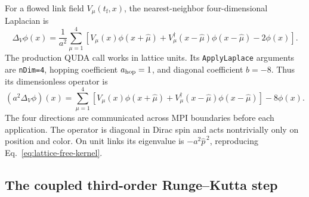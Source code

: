 \documentclass[11pt]{article}
\numberwithin{equation}{section}
\newcommand{\tf}{t_{\mathrm f}}
\begin{document}
For a flowed link field \(V_\mu(\tf,x)\), the nearest-neighbor
four-dimensional Laplacian is
\begin{equation}
  \Delta_V\phi(x)
  =
  \frac{1}{a^2}\sum_{\mu=1}^{4}
  \left[
    V_\mu(x)\phi(x+\hat\mu)
    +V_\mu^\dagger(x-\hat\mu)\phi(x-\hat\mu)
    -2\phi(x)
  \right].
  \label{eq:lattice-laplacian}
\end{equation}
The production QUDA call works in lattice units.  Its
\texttt{ApplyLaplace} arguments are \texttt{nDim=4}, hopping coefficient
\(a_{\rm hop}=1\), and diagonal coefficient \(b=-8\).  Thus its dimensionless
operator is
\begin{equation}
  (a^2\Delta_V\phi)(x)
  =\sum_{\mu=1}^{4}
  \left[
    V_\mu(x)\phi(x+\hat\mu)
    +V_\mu^\dagger(x-\hat\mu)\phi(x-\hat\mu)
  \right]-8\phi(x).
  \label{eq:quda-lattice-laplacian}
\end{equation}
The four directions are communicated across MPI boundaries before each
application.  The operator is diagonal in Dirac spin and acts nontrivially
only on position and color.  On unit links its eigenvalue is
\(-a^2\widehat p^{\,2}\), reproducing
Eq.~\eqref{eq:lattice-free-kernel}.

\subsection{The coupled third-order Runge--Kutta step}
\end{document}
